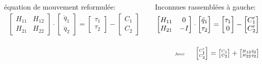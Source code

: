 \documentclass[10pt]{beamer}
\begin{document}
\begin{frame}
	\begin{columns}[T]
	\begin{column}{.5\textwidth}\footnotesize
	\begin{alertblock}{équation de mouvement reformulée:}
	  \begin{align}
	  	\begin{bmatrix}
		  H_{11} & H_{12} \\
		  H_{21} & H_{22}
		\end{bmatrix} 
		\cdot
		\begin{bmatrix}
		  \ddot{q}_{1} \\
		  \ddot{q}_{2}
		\end{bmatrix} 
		= 
		\begin{bmatrix}
		  \tau_{1} \\
		  \tau_{2}
		\end{bmatrix} 
		-
		\begin{bmatrix}
		  C_{1} \\
		  C_{2}
		\end{bmatrix} \label{equ_local_eqMvt_2}
		\end{align}
	\end{alertblock}
	\end{column}

	\begin{column}{.5\textwidth}\footnotesize
	\begin{alertblock}{Inconnues rassemblées à gauche:}
		\begin{align}
		\begin{bmatrix}
		  H_{11} & 0 \\
		  H_{21} &  -I
		\end{bmatrix} 
		\cdot
		\begin{bmatrix}
		  \ddot{q}_1 \\
		  \tau_2
		\end{bmatrix} 
		=
		\begin{bmatrix}
		  \tau_1 \\
		  0
		\end{bmatrix} 
		-
		\begin{bmatrix}
		  C'_{1} \\
		  C'_{2}
		\end{bmatrix} \label{equ_equationMvt_dynHyb2} \\
		\notag \\
		{\tiny \textnormal{Avec} \qquad
		\begin{bmatrix}
		  C'_{1} \\
		  C'_{2}
		\end{bmatrix}
		=
		\begin{bmatrix}
		  C_{1} \\
		  C_{2}
		\end{bmatrix}
		+
		\begin{bmatrix}
		  H_{12} \ddot{q}_2 \\
		  H_{22} \ddot{q}_2
		\end{bmatrix}} \label{equ_cPrime}
		\end{align}
	\end{alertblock}
	\end{column}
	\end{columns}
  
\end{frame}
\end{document}
